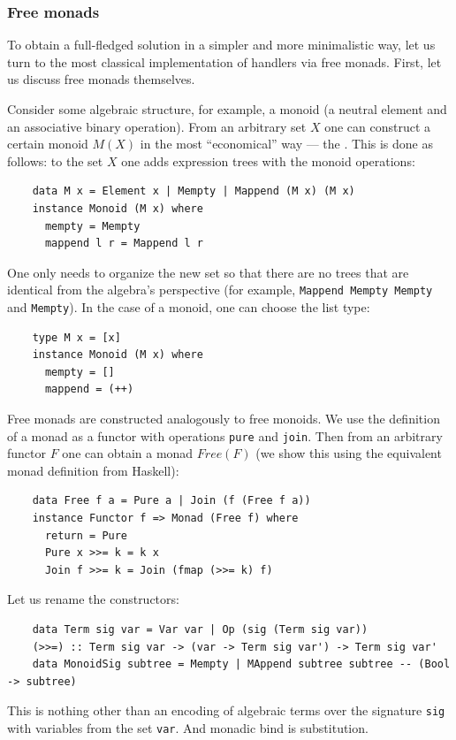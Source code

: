 \subsubsection{Free monads} \label{subsubsec:free-monads}

To obtain a full-fledged solution in a simpler and more minimalistic way, let us turn to the most classical implementation of handlers via free monads.
First, let us discuss free monads themselves.

Consider some algebraic structure, for example, a monoid (a neutral element and an associative binary operation).
From an arbitrary set $X$ one can construct a certain monoid $M(X)$ in the most ``economical'' way --- the .
This is done as follows: to the set $X$ one adds expression trees with the monoid operations:
\begin{verbatim}
    data M x = Element x | Mempty | Mappend (M x) (M x)
    instance Monoid (M x) where
      mempty = Mempty
      mappend l r = Mappend l r
\end{verbatim}
One only needs to organize the new set so that there are no trees that are identical from the algebra's perspective (for example, \texttt{Mappend Mempty Mempty} and \texttt{Mempty}).
In the case of a monoid, one can choose the list type:
\begin{verbatim}
    type M x = [x]
    instance Monoid (M x) where
      mempty = []
      mappend = (++)
\end{verbatim}

Free monads are constructed analogously to free monoids.
We use the definition of a monad as a functor with operations \texttt{pure} and \texttt{join}.
Then from an arbitrary functor $F$ one can obtain a monad $Free(F)$ (we show this using the equivalent monad definition from Haskell):
\begin{verbatim}
    data Free f a = Pure a | Join (f (Free f a))
    instance Functor f => Monad (Free f) where
      return = Pure
      Pure x >>= k = k x
      Join f >>= k = Join (fmap (>>= k) f)
\end{verbatim}

Let us rename the constructors:
\begin{verbatim}
    data Term sig var = Var var | Op (sig (Term sig var))
    (>>=) :: Term sig var -> (var -> Term sig var') -> Term sig var'
    data MonoidSig subtree = Mempty | MAppend subtree subtree -- (Bool -> subtree)
\end{verbatim}
This is nothing other than an encoding of algebraic terms over the signature \texttt{sig} with variables from the set \texttt{var}.
And monadic bind is substitution.

